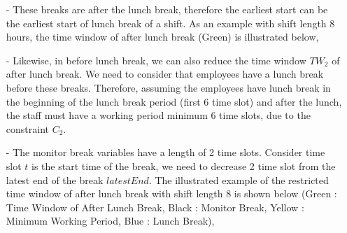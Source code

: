 \begin{itemize}
\begin{itemize}
\item[-] These breaks are after the lunch break, therefore the earliest start can be the  earliest start of lunch break of a shift. As an example with shift length 8 hours, the time window of after lunch break (Green) is illustrated below, \\



\item[-] Likewise, in before lunch break, we can also reduce the time window $TW_2$ of after lunch break. We need to consider that employees have a lunch break before these breaks. Therefore, assuming the employees have lunch break in the beginning of the lunch break period (first 6 time slot) and after the lunch, the staff must have a working period minimum 6 time slots, due to the constraint $C_2$. 

\item[-]  The monitor break variables have a length of 2 time slots. Consider time slot $t$ is the start time of the break, we need to decrease 2 time slot from the latest end of the break  $latestEnd$. The illustrated example of the restricted time window of after lunch break with shift length 8 is shown below (Green : Time Window of After Lunch Break, Black : Monitor Break, Yellow : Minimum Working Period, Blue : Lunch Break), \\


\end{itemize}
\end{itemize}
